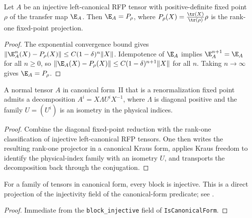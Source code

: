 \begin{theorem}%
    \label{thm:transferMap_eq_fixedPointProj_of_isRFP_injective}
    \leanok
    Let $A$ be an injective left-canonical RFP tensor with positive-definite
    fixed point $\rho$ of the transfer map $\E_A$. Then
    $\E_A = P_\rho$, where $P_\rho(X) = \frac{\tr(X)}{\tr(\rho)} \rho$
    is the rank-one fixed-point projection.
\end{theorem}
\begin{proof}\leanok
    The exponential convergence bound gives
    $\lVert \E_A^n(X) - P_\rho(X)\rVert \le C(1-\delta)^n\lVert X\rVert$.
    Idempotence of $\E_A$ implies $\E_A^{n+1} = \E_A$ for all $n \ge 0$,
    so $\lVert \E_A(X) - P_\rho(X)\rVert \le C(1-\delta)^{n+1}\lVert X\rVert$
    for all $n$. Taking $n \to \infty$ gives $\E_A = P_\rho$.
\end{proof}

\begin{theorem}%
    \label{thm:rfp_nt_structural_full}
    \leanok
    A normal tensor $A$ in canonical form~II that is a renormalization fixed
    point admits a decomposition $A^i = X \Lambda U^i X^{-1}$, where
    $\Lambda$ is diagonal positive and the family $U = (U^i)$ is an
    isometry in the physical indices.
\end{theorem}
\begin{proof}\leanok
    Combine the diagonal fixed-point reduction with the rank-one
    classification of injective left-canonical RFP tensors. One then writes the
    resulting rank-one projector in a canonical Kraus form, applies Kraus
    freedom to identify the physical-index family with an isometry $U$, and
    transports the decomposition back through the conjugation.
\end{proof}

\begin{theorem}\label{thm:rfp_cf_structural}
    \leanok
    For a family of tensors in canonical form, every block is injective.
    This is a direct projection of the injectivity field of the canonical-form
    predicate; see \cite[Section~2.3]{Cirac2016MPDO_arXiv}.
\end{theorem}
\begin{proof}\leanok
    Immediate from the \texttt{block\_injective} field of
    \texttt{IsCanonicalForm}.
\end{proof}


